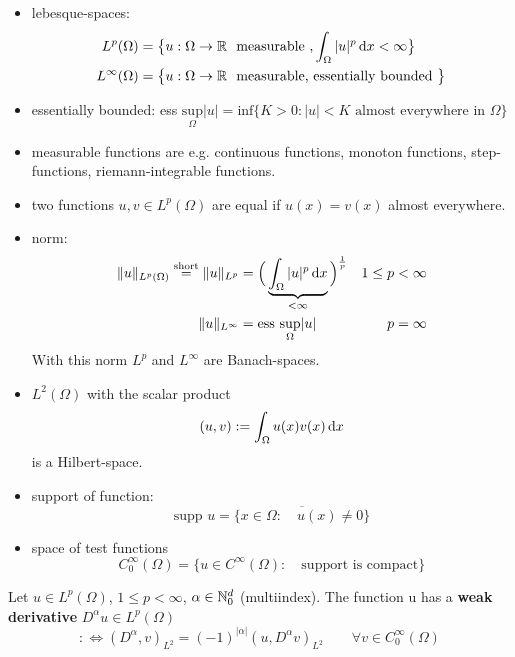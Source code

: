 	\begin{itemize}
		\item lebesque-spaces: 
		\begin{align*}
		L^p(\Omega) &= \big\{ u: \Omega \to \mathbb{R} \ \text{ measurable } , \int_\Omega |u|^p \mathop{}\!\mathrm{d} x < \infty \big\}  \\
		L^\infty(\Omega) &= \big\{ u: \Omega \to \mathbb{R} \ \text{ measurable, essentially bounded } \big\}
		\end{align*}
		\item essentially bounded: ess $ \underset{\Omega}{\text{sup}} |u| = \text{inf}\big\{ K >0 : |u|<K \text{ almost everywhere in } \Omega \big\}  $
		
		\item measurable functions are e.g. continuous functions, monoton functions, step-functions, riemann-integrable functions.
		\item two functions $u,v \in L^p(\Omega)$ are equal if $u(x) = v(x)$ almost everywhere.
		\item norm: 
		\begin{align*}
			\|u\|_{L^p(\Omega)} \overset{\text{short}}{=}\|u\|_{L^p} &= \Big (\underbrace{ \int_\Omega |u|^p \mathop{}\!\mathrm{d} x}_{ < \infty} \Big )^{\frac{1}{p} } & 1 \leq p&<\infty \\
		\|u\|_{L^\infty} &= \text{ess }\underset{\Omega}{\text{sup}} |u| & p&= \infty 
		\end{align*}
		With this norm $L^p$ and $L^\infty$ are Banach-spaces.
		\item $L^2(\Omega)$ with the scalar product
		\begin{equation*}
		(u,v) := \int_\Omega u(x)v(x) \mathop{}\!\mathrm{d} x 
		\end{equation*}
		is a Hilbert-space.
		\item support of function:
		\begin{equation*}
		\text{supp }u  = \overline{\big \{ x \in \Omega:\quad u(x)\neq0  \big \}} 
		\end{equation*}
		\item space of test functions
		\begin{equation*}
		C^\infty_0(\Omega) = \big \{ u \in C^\infty(\Omega):\quad \text{support is compact}  \big\}
		\end{equation*}
	\end{itemize}



\begin{defi}
Let $ u \in L^p(\Omega)$, $1 \leq p< \infty$, $\alpha \in \mathbb{N}^d_0$ (multiindex).\enter
The function u has a \textbf{weak derivative} $ D^\alpha u \in L^p(\Omega) $ 
\begin{equation*}
	:\iff (D^\alpha,v)_{L^2} = (-1)^{|\alpha|} (u,D^\alpha v)_{L^2} \qquad \forall v \in C^\infty_0(\Omega)
\end{equation*}
\end{defi}

